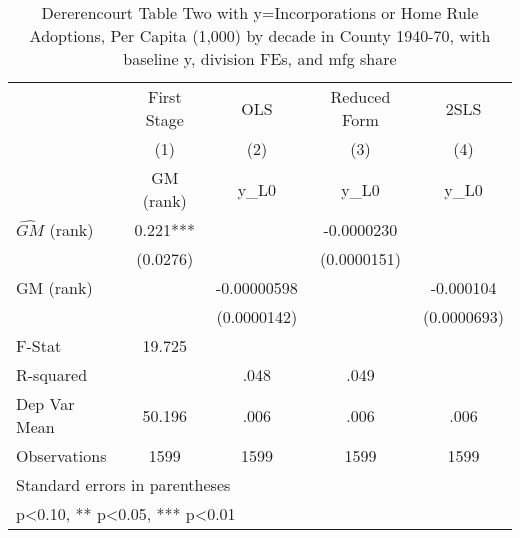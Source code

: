 \begin{table}[htbp]\centering
\def\sym#1{\ifmmode^{#1}\else\(^{#1}\)\fi}
\caption{Dererencourt Table Two with y=Incorporations or Home Rule Adoptions, Per Capita (1,000) by decade in County 1940-70, with baseline y, division FEs, and mfg share}
\begin{tabular}{l*{4}{c}}
\toprule
                    & First Stage   &         OLS   &Reduced Form   &        2SLS   \\
                    &\multicolumn{1}{c}{(1)}&\multicolumn{1}{c}{(2)}&\multicolumn{1}{c}{(3)}&\multicolumn{1}{c}{(4)}\\
                    &\multicolumn{1}{c}{GM  (rank)}&\multicolumn{1}{c}{y\_L0}&\multicolumn{1}{c}{y\_L0}&\multicolumn{1}{c}{y\_L0}\\
\midrule
$\hat{GM}$ (rank)   &       0.221***&               &  -0.0000230   &               \\
                    &    (0.0276)   &               & (0.0000151)   &               \\
\addlinespace
GM  (rank)          &               & -0.00000598   &               &   -0.000104   \\
                    &               & (0.0000142)   &               & (0.0000693)   \\
\midrule
F-Stat              &      19.725   &               &               &               \\
R-squared           &               &        .048   &        .049   &               \\
Dep Var Mean        &      50.196   &        .006   &        .006   &        .006   \\
Observations        &        1599   &        1599   &        1599   &        1599   \\
\bottomrule
\multicolumn{5}{l}{\footnotesize Standard errors in parentheses}\\
\multicolumn{5}{l}{\footnotesize * p<0.10, ** p<0.05, *** p<0.01}\\
\end{tabular}
\end{table}
